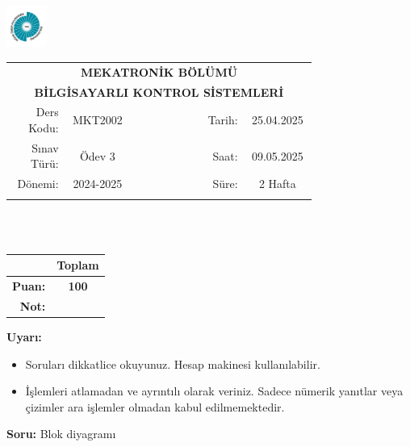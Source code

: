 \newcommand\UniversiteAdi{Niğde Ömer Halisdemir Üniversitesi}
\newcommand\BolumAdi{MEKATRONİK BÖLÜMÜ}
\newcommand\DersKodu{MKT2002}
\newcommand\DersAdi{BİLGİSAYARLI KONTROL SİSTEMLERİ}
\newcommand\SinavAdi{Ödev 3}
\newcommand\SinavTarihi{25.04.2025}
\newcommand\SinavSaati{09.05.2025}
\newcommand\SinavSuresi{2 Hafta}
\pagestyle{fancy}
\fancyhf{} %
\noindent \includegraphics[width=0.1\textwidth]{logo}
\begin{tabular}{
		p{0.15\linewidth}
		p{0.15\linewidth}
		p{0.2\linewidth}
		p{0.1\linewidth}
		p{0.15\linewidth}}
	\multicolumn{5}{c}{\textbf{\BolumAdi}}        \\
	\multicolumn{5}{c}{\textbf{\DersAdi}}         \\\hline
	\multicolumn{1}{|r|}{Ders Kodu:}  &
	\multicolumn{1}{|c|}{\DersKodu}   &
	\multicolumn{1}{|c|}{}            &
	\multicolumn{1}{|r|}{Tarih:}      &
	\multicolumn{1}{|c|}{\SinavTarihi}            \\\hline
	\multicolumn{1}{|r|}{Sınav Türü:} &
	\multicolumn{1}{|c|}{\SinavAdi}   &
	\multicolumn{1}{|c|}{}            &
	\multicolumn{1}{|r|}{Saat:}       &
	\multicolumn{1}{|c|}{\SinavSaati}             \\\hline
	\multicolumn{1}{|r|}{Dönemi:}     &
	\multicolumn{1}{|c|}{2024-2025}   &
	\multicolumn{1}{|c|}{}            &
	\multicolumn{1}{|r|}{Süre:}       &
	\multicolumn{1}{|c|}{\SinavSuresi}            \\\hline
	                                  &   &  &  & \\
\end{tabular}\\\\
\noindent\begin{center}
	\begin{tabular}{|r|c|}\hline
		               & \textbf{Toplam} \\\hline
		\textbf{Puan:} & \textbf{100}    \\\hline
		\textbf{Not:}  &                 \\\hline
	\end{tabular}\end{center}
\noindent\textbf{Uyarı:}
\begin{itemize}\bfseries
	\item Soruları dikkatlice okuyunuz. Hesap makinesi kullanılabilir.
	\item İşlemleri atlamadan ve ayrıntılı olarak veriniz. Sadece nümerik yanıtlar veya çizimler ara işlemler olmadan kabul edilmemektedir.
\end{itemize}
\noindent\textbf{Soru:} Blok diyagramı

